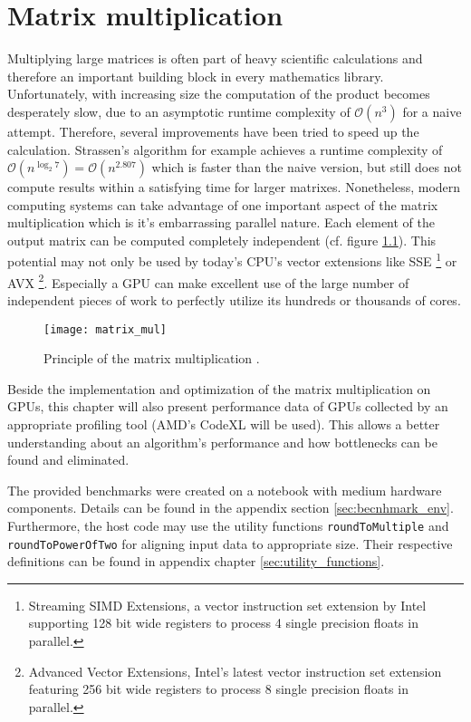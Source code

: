 \chapter{Matrix multiplication}
\label{sec:matrix_mul}

Multiplying large matrices is often part of heavy scientific calculations and therefore an important building block in every mathematics library. Unfortunately, with increasing size the computation of the product becomes desperately slow, due to an asymptotic runtime complexity of $\mathcal{O}(n^3)$ for a naive attempt. Therefore, several improvements have been tried to speed up the calculation. Strassen's algorithm for example achieves a runtime complexity of $\mathcal{O}(n^{\log_2 7}) = \mathcal{O}(n^{2.807})$ \cite{strassen} which is faster than the naive version, but still does not compute results within a satisfying time for larger matrixes.
Nonetheless, modern computing systems can take advantage of one important aspect of the matrix multiplication which is it's embarrassing parallel nature. Each element of the output matrix can be computed completely independent (cf. figure \ref{fig:matrix_mul}). This potential may not only be used by today's CPU's vector extensions like SSE \footnote{Streaming SIMD Extensions, a vector instruction set extension by Intel supporting 128 bit wide registers to process 4 single precision floats in parallel.} or AVX \footnote{Advanced Vector Extensions, Intel's latest vector instruction set extension featuring 256 bit wide registers to process 8 single precision floats in parallel.}. Especially a GPU can make excellent use of the large number of independent pieces of work to perfectly utilize its hundreds or thousands of cores.

\begin{figure}[h]
\centering
\texttt{[image: matrix\_mul]}
\caption{Principle of the matrix multiplication \cite{wiki_matrix_mul}.}
\label{fig:matrix_mul}
\end{figure}

Beside the implementation and optimization of the matrix multiplication on GPUs, this chapter will also present performance data of GPUs collected by an appropriate profiling tool (AMD's CodeXL will be used). This allows a better understanding about an algorithm's performance and how bottlenecks can be found and eliminated.

The provided benchmarks were created on a notebook with medium hardware components. Details can be found in the appendix section \ref{sec:becnhmark_env}. Furthermore, the host code may use the utility functions \lstinline!roundToMultiple! and \lstinline!roundToPowerOfTwo! for aligning input data to appropriate size. Their respective definitions can be found in appendix chapter \ref{sec:utility_functions}.

